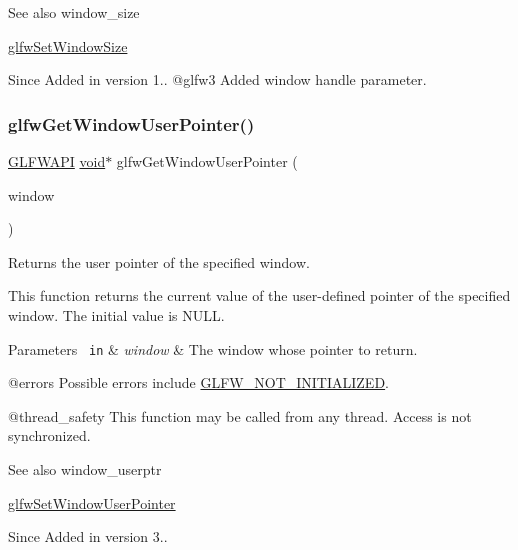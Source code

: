 \begin{DoxySeeAlso}{See also}
window\+\_\+size 

\mbox{\hyperlink{group__window_gae54d1f4915ded15e267ddd3f41496cd2}{glfw\+Set\+Window\+Size}}
\end{DoxySeeAlso}
\begin{DoxySince}{Since}
Added in version 1.. @glfw3 Added window handle parameter. 
\end{DoxySince}
\mbox{\label{group__window_ga0a9ff3b4bf8589e9518e8816d06a8f50}} 
\subsubsection{\texorpdfstring{glfwGetWindowUserPointer()}{glfwGetWindowUserPointer()}}
{\footnotesize\ttfamily \mbox{\hyperlink{glfw3_8h_a56da5036b2cc259351ae22fd6439bb47}{G\+L\+F\+W\+A\+PI}} \mbox{\hyperlink{glad_8h_a950fc91edb4504f62f1c577bf4727c29}{void}}$\ast$ glfw\+Get\+Window\+User\+Pointer (\begin{DoxyParamCaption}\item[{\mbox{\hyperlink{group__window_ga3c96d80d363e67d13a41b5d1821f3242}{G\+L\+F\+Wwindow}} $\ast$}]{window }\end{DoxyParamCaption})}



Returns the user pointer of the specified window. 

This function returns the current value of the user-\/defined pointer of the specified window. The initial value is {\ttfamily N\+U\+LL}.


\begin{DoxyParams}[1]{Parameters}
\mbox{\texttt{ in}}  & {\em window} & The window whose pointer to return.\\
\hline
\end{DoxyParams}
@errors Possible errors include \mbox{\hyperlink{group__errors_ga2374ee02c177f12e1fa76ff3ed15e14a}{G\+L\+F\+W\+\_\+\+N\+O\+T\+\_\+\+I\+N\+I\+T\+I\+A\+L\+I\+Z\+ED}}.

@thread\+\_\+safety This function may be called from any thread. Access is not synchronized.

\begin{DoxySeeAlso}{See also}
window\+\_\+userptr 

\mbox{\hyperlink{group__window_gacc9e68faee3c1763b54cd9bc405cf43e}{glfw\+Set\+Window\+User\+Pointer}}
\end{DoxySeeAlso}
\begin{DoxySince}{Since}
Added in version 3.. 
\end{DoxySince}
\mbox{\label{group__window_gaa17e287d521544bdeceafa09ac036e20}} 
